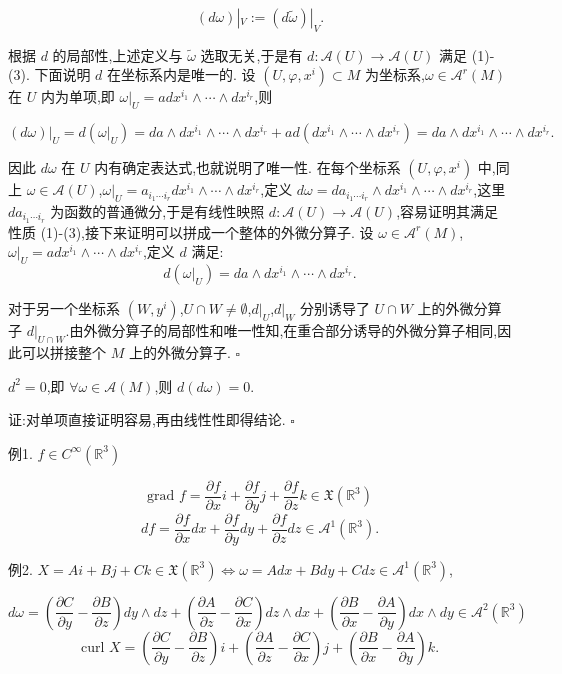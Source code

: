 \[
(d\omega)|_V := (d\tilde{\omega})|_V.
\]

根据 $d$ 的局部性,上述定义与 $\tilde{\omega}$ 选取无关,于是有 $d: \mathcal{A}(U) \rightarrow \mathcal{A}(U)$ 满足 (1)-(3).
下面说明 $d$ 在坐标系内是唯一的.
设 $(U, \varphi, x^i) \subset M$ 为坐标系,$\omega \in \mathcal{A}^r(M)$ 在 $U$ 内为单项,即 $\omega|_U = a dx^{i_1} \wedge \cdots \wedge dx^{i_r}$,则

\[
(d\omega)|_U = d(\omega|_U) = da \wedge dx^{i_1} \wedge \cdots \wedge dx^{i_r} + a d(dx^{i_1} \wedge \cdots \wedge dx^{i_r}) = da \wedge dx^{i_1} \wedge \cdots \wedge dx^{i_r}.
\]

因此 $d\omega$ 在 $U$ 内有确定表达式,也就说明了唯一性.
在每个坐标系 $(U, \varphi, x^i)$ 中,同上 $\omega \in \mathcal{A}(U)$,$\omega|_U = a_{i_1 \cdots i_r}dx^{i_1} \wedge \cdots \wedge dx^{i_r}$,定义 $d\omega = da_{i_1 \cdots i_r} \wedge dx^{i_1} \wedge \cdots \wedge dx^{i_r}$,这里 $da_{i_1 \cdots i_r}$ 为函数的普通微分,于是有线性映照 $d: \mathcal{A}(U) \rightarrow \mathcal{A}(U)$,容易证明其满足性质 (1)-(3),接下来证明可以拼成一个整体的外微分算子.
设 $\omega \in \mathcal{A}^r(M)$,$\omega|_U = a dx^{i_1} \wedge \cdots \wedge dx^{i_r}$,定义 $d$ 满足:
\[
d(\omega|_U) = da \wedge dx^{i_1} \wedge \cdots \wedge dx^{i_r}.
\]

对于另一个坐标系 $(W, y^i)$,$U \cap W \neq \emptyset$,$d|_U$,$d|_W$ 分别诱导了 $U \cap W$ 上的外微分算子 $d|_{U \cap W}$.由外微分算子的局部性和唯一性知,在重合部分诱导的外微分算子相同,因此可以拼接整个 $M$ 上的外微分算子. $\square$

\begin{lemma}[Poincaré]
$d^2 = 0$,即 $\forall \omega \in \mathcal{A}(M)$,则 $d(d\omega) = 0$.
\end{lemma}

证:对单项直接证明容易,再由线性性即得结论. $\square$

例1. $f \in C^\infty(\mathbb{R}^3)$

\[
\text{grad }f = \frac{\partial f}{\partial x}i + \frac{\partial f}{\partial y}j + \frac{\partial f}{\partial z}k \in \mathfrak{X}(\mathbb{R}^3)
\]
\[
df = \frac{\partial f}{\partial x}dx + \frac{\partial f}{\partial y}dy + \frac{\partial f}{\partial z}dz \in \mathcal{A}^1(\mathbb{R}^3).
\]

例2. $X = Ai + Bj + Ck \in \mathfrak{X}(\mathbb{R}^3) \iff \omega = Adx + Bdy + Cdz \in \mathcal{A}^1(\mathbb{R}^3)$,

\[
d\omega = \left(\frac{\partial C}{\partial y} - \frac{\partial B}{\partial z}\right)dy \wedge dz + \left(\frac{\partial A}{\partial z} - \frac{\partial C}{\partial x}\right)dz \wedge dx + \left(\frac{\partial B}{\partial x} - \frac{\partial A}{\partial y}\right)dx \wedge dy \in \mathcal{A}^2(\mathbb{R}^3)
\]
\[
\text{curl }X = \left(\frac{\partial C}{\partial y} - \frac{\partial B}{\partial z}\right)i + \left(\frac{\partial A}{\partial z} - \frac{\partial C}{\partial x}\right)j + \left(\frac{\partial B}{\partial x} - \frac{\partial A}{\partial y}\right)k.
\]

